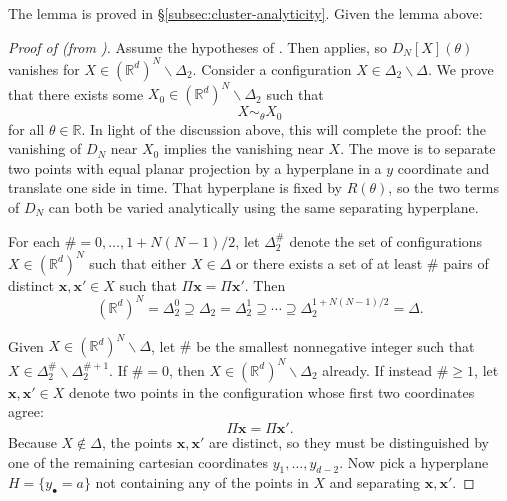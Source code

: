 \documentclass[11pt, letterpaper, reqno]{amsart}
\theoremstyle{definition}
\theoremstyle{remark}
\newcommand{\bbR}{\mathbb{R}}
\newcommand{\bfx}{\mathbf{x}}
\begin{document}
The lemma is proved in \S\ref{subsec:cluster-analyticity}. Given the lemma above:
\begin{proof}[Proof of  (from )]
Assume the hypotheses of . 
Then  applies, so $D_N[X](\theta)$ vanishes for $X\in (\bbR^d)^N\backslash \Delta_2$. 
Consider a configuration $X\in \Delta_2\backslash \Delta$.
We prove that there exists some $X_0 \in (\bbR^d)^N\backslash \Delta_2 $ such that 
\begin{equation}
    X\sim_\theta X_0 
\end{equation}
for all $\theta\in \bbR$. In light of the discussion above, this will complete the proof: the vanishing of $D_N$ near $X_0$ implies the vanishing near $X$.
The move is to separate two points with equal planar projection by a
hyperplane in a $y$ coordinate and translate one side in time. That
hyperplane is fixed by $R(\theta)$, so the two terms of $D_N$ can both
be varied analytically using the same separating hyperplane. 

    For each $\#=0,\dots,1+N(N-1)/2$, let $\Delta_2^\#$ denote the set of configurations $X\in (\bbR^d)^N$ such that either $X\in \Delta$ or there exists a set of at least $\#$ pairs of distinct $\bfx,\bfx'\in X$ such that $\Pi \bfx=\Pi \bfx'$. Then 
    \begin{equation}
        (\bbR^d)^{N}=\Delta_2^0\supseteq \Delta_2=\Delta_2^1\supseteq \cdots \supseteq   \Delta_2^{1+N(N-1)/2}=\Delta  .
    \end{equation}

    Given $X\in (\bbR^d)^N\backslash \Delta$,
    let $\#$ be the smallest nonnegative integer such that $X\in \Delta_2^\#\backslash \Delta_2^{\#+1}$. 
    If $\#=0$, then $X\in (\bbR^d)^N\backslash \Delta_2$ already.
    If instead $\#\geq 1$, let $\bfx,\bfx'\in X$ denote two points in the configuration whose first two coordinates agree:
    \begin{equation}
        \Pi \bfx = \Pi \bfx'. 
    \end{equation}
    Because $X\notin \Delta$, the points $\bfx,\bfx'$ are distinct, so they must be distinguished by one of the remaining cartesian coordinates $y_1,\dots,y_{d-2}$. 
    Now pick a hyperplane $H=\{y_\bullet = a\}$ not containing any of the points in $X$ and separating $\bfx,\bfx'$.  


\end{proof}
\end{document}
